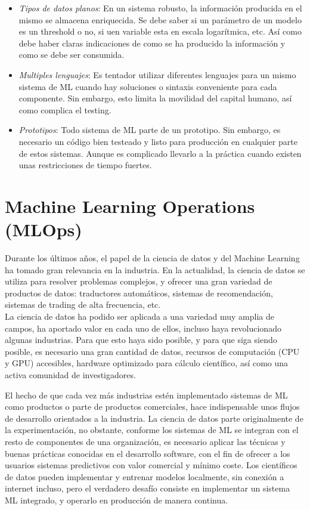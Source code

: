\documentclass[
  12pt,
  a4paperpaper,
]{report}
\providecommand{\tightlist}{%
  \setlength{\itemsep}{0pt}\setlength{\parskip}{0pt}}
\begin{document}
\begin{itemize}
  \begin{itemize}
  \tightlist
  \item
    \emph{Tipos de datos planos}: En un sistema robusto, la información
    producida en el mismo se almacena enriquecida. Se debe saber si un
    parámetro de un modelo es un threshold o no, si uen variable esta en
    escala logarítmica, etc. Así como debe haber claras indicaciones de
    como se ha producido la información y como se debe ser consumida.
  \item
    \emph{Multiples lenguajes}: Es tentador utilizar diferentes
    lenguajes para un mismo sistema de ML cuando hay soluciones o
    sintaxis conveniente para cada componente. Sin embargo, esto limita
    la movilidad del capital humano, así como complica el testing.
  \item
    \emph{Prototipos}: Todo sistema de ML parte de un prototipo. Sin
    embargo, es necesario un código bien testeado y listo para
    producción en cualquier parte de estos sistemas. Aunque es
    complicado llevarlo a la práctica cuando existen unas restricciones
    de tiempo fuertes.
  \end{itemize}
\end{itemize}

\hypertarget{machine-learning-operations-mlops}{%
\section{Machine Learning Operations
(MLOps)}\label{machine-learning-operations-mlops}}

Durante los últimos años, el papel de la ciencia de datos y del Machine
Learning ha tomado gran relevancia en la industria. En la actualidad, la
ciencia de datos se utiliza para resolver problemas complejos, y ofrecer
una gran variedad de productos de datos: traductores automáticos,
sistemas de recomendación, sistemas de trading de alta frecuencia,
etc.\\
La ciencia de datos ha podido ser aplicada a una variedad muy amplia de
campos, ha aportado valor en cada uno de ellos, incluso haya
revolucionado algunas industrias. Para que esto haya sido posible, y
para que siga siendo posible, es necesario una gran cantidad de datos,
recursos de computación (CPU y GPU) accesibles, hardware optimizado para
cálculo científico, así como una activa comunidad de investigadores.

El hecho de que cada vez más industrias estén implementado sistemas de
ML como productos o parte de productos comerciales, hace indispensable
unos flujos de desarrollo orientados a la industria. La ciencia de datos
parte originalmente de la experimentación, no obstante, conforme los
sistemas de ML se integran con el resto de componentes de una
organización, es necesario aplicar las técnicas y buenas prácticas
conocidas en el desarrollo software, con el fin de ofrecer a los
usuarios sistemas predictivos con valor comercial y mínimo coste. Los
científicos de datos pueden implementar y entrenar modelos localmente,
sin conexión a internet incluso, pero el verdadero desafío consiste en
implementar un sistema ML integrado, y operarlo en producción de manera
continua.
\end{document}
